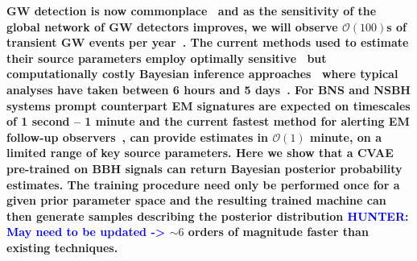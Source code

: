 \documentclass[%
showpacs,
nofootinbib,
 amsmath,amssymb,
 aps,
 twocolumn,
 prl,
 reprint,
floatfix,
]{revtex4-1}
\newcommand{\hunter}[1]{\textbf{\textcolor{blue}{HUNTER: #1}}}
\begin{document}
%
%
%
\textbf{ 
%
%
\ac{GW} detection is now
commonplace~\cite{PhysRevX.6.041015,PhysRevLett.119.161101} and as the
sensitivity of the global network of \ac{GW} detectors improves, we will
observe $\mathcal{O}(100)$s of transient \ac{GW} events per
year~\cite{2018LRR....21....3A}. The current methods used to estimate their
source parameters employ optimally sensitive~\cite{2009CQGra..26o5017S} but
computationally costly Bayesian inference approaches~\cite{1409.7215} where
typical analyses have taken between 6 hours and 5 days~\cite{gracedb_O3}.
%
%
For \ac{BNS} and \ac{NSBH} systems prompt counterpart \ac{EM} signatures are
expected on timescales of 1 second -- 1 minute and the current fastest method
for alerting \ac{EM} follow-up observers~\cite{2016PhRvD..93b4013S}, can
provide estimates in $\mathcal{O}(1)$ minute, on a limited range of key source
parameters. 
%
%
Here we show that a \ac{CVAE}~\cite{1904.06264,1812.04405} pre-trained on
\ac{BBH} signals can return Bayesian posterior probability estimates. The
training procedure need only be performed once for a given prior parameter
space and the resulting trained machine can then generate samples describing
the posterior distribution \hunter{May need to be updated ->} $\sim 6$ orders of magnitude faster than existing
techniques.}
%
\end{document}
